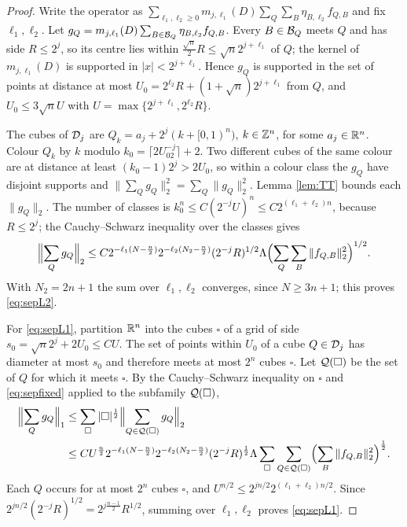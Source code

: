 \begin{proof}
Write the operator as $\sum_{\ell_1,\ell_2\ge0}m_{j,\ell_1}(D)\sum_Q\sum_B\eta_{B,\ell_2}f_{Q,B}$ and fix
$\ell_1,\ell_2$. Let $g_Q=m_{j,\ell_1}(D)\sum_{B\in\mathcal B_Q}\eta_{B,\ell_2}f_{Q,B}$. Every $B\in\mathcal B_Q$ meets $Q$ and has
side $R\le2^j$, so its centre lies within $\frac{\sqrt n}2R\le\sqrt n2^{j+\ell_1}$ of $Q$; the kernel of
$m_{j,\ell_1}(D)$ is supported in $|x|<2^{j+\ell_1}$. Hence $g_Q$ is supported in the set of points at
distance at most $U_0=2^{\ell_2}R+(1+\sqrt n)2^{j+\ell_1}$ from $Q$, and $U_0\le3\sqrt nU$ with
$U=\max\{2^{j+\ell_1},2^{\ell_2}R\}$.

The cubes of $\mathcal D_j$ are $Q_k=a_j+2^j(k+[0,1)^n)$, $k\in\mathbb{Z}^n$, for some $a_j\in\mathbb{R}^n$. Colour $Q_k$ by $k$
modulo $k_0=\lceil 2U_02^{-j}\rceil+2$. Two different cubes of the same colour are at distance at least
$(k_0-1)2^j>2U_0$, so within a colour class the $g_Q$ have disjoint supports and
$\|\sum_Qg_Q\|_2^2=\sum_Q\|g_Q\|_2^2$. Lemma \ref{lem:TT} bounds each $\|g_Q\|_2$. The number of classes is
$k_0^n\le C(2^{-j}U)^n\le C2^{(\ell_1+\ell_2)n}$, because $R\le2^j$; the Cauchy--Schwarz inequality over the
classes gives
\begin{equation}\label{eq:sepfixed}
\Bigl\|\sum_Qg_Q\Bigr\|_2\le C2^{-\ell_1(N-\frac n2)}2^{-\ell_2(N_2-\frac n2)}(2^{-j}R)^{1/2}\Lambda
\Bigl(\sum_Q\sum_B\|f_{Q,B}\|_2^2\Bigr)^{1/2} .
\end{equation}
With $N_2=2n+1$ the sum over $\ell_1,\ell_2$ converges, since $N\ge3n+1$; this proves \eqref{eq:sepL2}.

For \eqref{eq:sepL1}, partition $\mathbb{R}^n$ into the cubes $\square$ of a grid of side $s_0=\sqrt n2^j+2U_0\le CU$.
The set of points within $U_0$ of a cube $Q\in\mathcal D_j$ has diameter at most $s_0$ and therefore meets at
most $2^n$ cubes $\square$. Let $\mathcal Q(\square)$ be the set of $Q$ for which it meets $\square$. By the
Cauchy--Schwarz inequality on $\square$ and \eqref{eq:sepfixed} applied to the subfamily $\mathcal Q(\square)$,
\begin{align*}
\Bigl\|\sum_Qg_Q\Bigr\|_1&\le\sum_\square|\square|^{\frac12}\Bigl\|\sum_{Q\in\mathcal Q(\square)}g_Q\Bigr\|_2\\
&\le C U^{\frac n2}2^{-\ell_1(N-\frac n2)}2^{-\ell_2(N_2-\frac n2)}(2^{-j}R)^{\frac12}\Lambda
\sum_\square\sum_{Q\in\mathcal Q(\square)}\Bigl(\sum_B\|f_{Q,B}\|_2^2\Bigr)^{\frac12} .
\end{align*}
Each $Q$ occurs for at most $2^n$ cubes $\square$, and $U^{n/2}\le2^{jn/2}2^{(\ell_1+\ell_2)n/2}$. Since
$2^{jn/2}(2^{-j}R)^{1/2}=2^{j\frac{n-1}2}R^{1/2}$, summing over $\ell_1,\ell_2$ proves \eqref{eq:sepL1}.
\end{proof}

